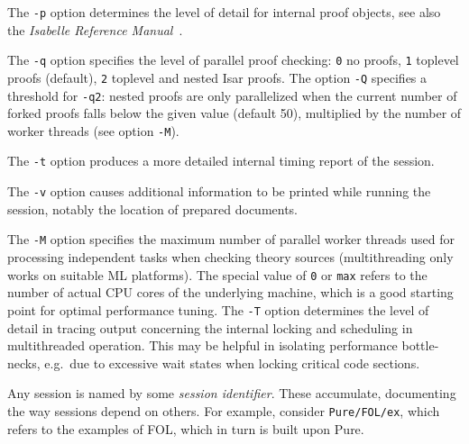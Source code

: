 \begin{isabellebody}
\begin{isamarkuptext}
  \medskip The \verb|-p| option determines the level of detail
  for internal proof objects, see also the \emph{Isabelle Reference
  Manual}~\cite{isabelle-ref}.

  \medskip The \verb|-q| option specifies the level of parallel
  proof checking: \verb|0| no proofs, \verb|1| toplevel
  proofs (default), \verb|2| toplevel and nested Isar proofs.
  The option \verb|-Q| specifies a threshold for \verb|-q2|: nested proofs are only parallelized when the current number
  of forked proofs falls below the given value (default 50),
  multiplied by the number of worker threads (see option \verb|-M|).

  \medskip The \verb|-t| option produces a more detailed
  internal timing report of the session.

  \medskip The \verb|-v| option causes additional information
  to be printed while running the session, notably the location of
  prepared documents.

  \medskip The \verb|-M| option specifies the maximum number of
  parallel worker threads used for processing independent tasks when
  checking theory sources (multithreading only works on suitable ML
  platforms).  The special value of \verb|0| or \verb|max|
  refers to the number of actual CPU cores of the underlying machine,
  which is a good starting point for optimal performance tuning.  The
  \verb|-T| option determines the level of detail in tracing
  output concerning the internal locking and scheduling in
  multithreaded operation.  This may be helpful in isolating
  performance bottle-necks, e.g.\ due to excessive wait states when
  locking critical code sections.

  \medskip Any \hyperlink{tool.usedir}{\mbox{}} session is named by some \emph{session
  identifier}. These accumulate, documenting the way sessions depend
  on others. For example, consider \verb|Pure/FOL/ex|, which
  refers to the examples of FOL, which in turn is built upon Pure.


\end{isamarkuptext}
\end{isabellebody}
